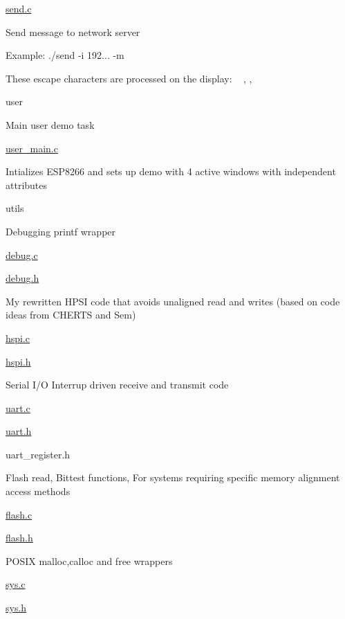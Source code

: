 \hyperlink{send_8c}{send.\+c}
\begin{DoxyItemize}
\item Send message to network server
\item Example\+: ./send -\/i 192... -\/m \textquotesingle{}\textquotesingle{}
\begin{DoxyItemize}
\item These escape characters are processed on the display\+: ~\newline
, , 
\end{DoxyItemize}
\end{DoxyItemize}

user
\begin{DoxyItemize}
\item Main user demo task
\item \hyperlink{user__main_8c}{user\+\_\+main.\+c}
\begin{DoxyItemize}
\item Intializes E\+S\+P8266 and sets up demo with 4 active windows with independent attributes
\end{DoxyItemize}
\end{DoxyItemize}

utils
\begin{DoxyItemize}
\item Debugging printf wrapper
\begin{DoxyItemize}
\item \hyperlink{debug_8c}{debug.\+c}
\item \hyperlink{debug_8h}{debug.\+h}
\end{DoxyItemize}
\item My rewritten H\+P\+SI code that avoids unaligned read and writes (based on code ideas from C\+H\+E\+R\+TS and Sem)
\begin{DoxyItemize}
\item \hyperlink{hspi_8c}{hspi.\+c}
\item \hyperlink{hspi_8h}{hspi.\+h}
\end{DoxyItemize}
\item Serial I/O Interrup driven receive and transmit code
\begin{DoxyItemize}
\item \hyperlink{uart_8c}{uart.\+c}
\item \hyperlink{uart_8h}{uart.\+h}
\item uart\+\_\+register.\+h
\end{DoxyItemize}
\item Flash read, Bittest functions, For systems requiring specific memory alignment access methods
\begin{DoxyItemize}
\item \hyperlink{flash_8c}{flash.\+c}
\item \hyperlink{flash_8h}{flash.\+h}
\end{DoxyItemize}
\item P\+O\+S\+IX malloc,calloc and free wrappers
\begin{DoxyItemize}
\item \hyperlink{sys_8c}{sys.\+c}
\item \hyperlink{sys_8h}{sys.\+h}
\end{DoxyItemize}
\end{DoxyItemize}

